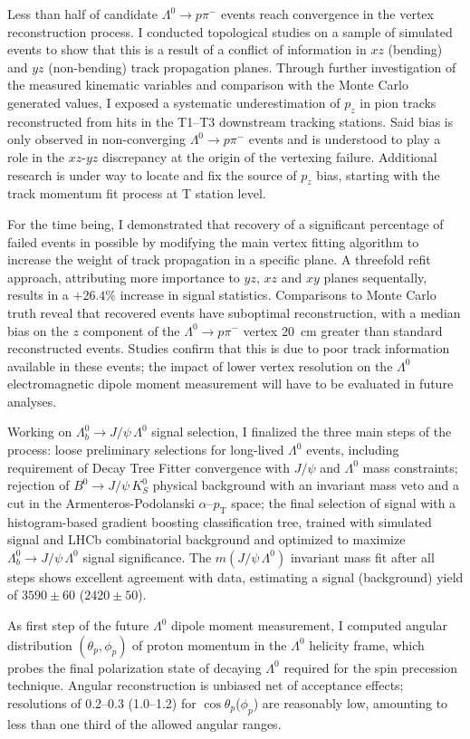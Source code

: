 \documentclass[12pt,a4paper]{book}
\newcommand{\demonstratorshort}{$\Lambda_b^0 \rightarrow J/\psi\,\Lambda^0$\xspace}
\newcommand{\physbkgshort}{$B^0 \rightarrow J/\psi\,K^0_S$\xspace}
\newcommand{\lz}{$\Lambda^0$\xspace}
\newcommand{\jpsi}{$J/\psi$\xspace}
\newcommand{\lambdadecay}{$\Lambda^0 \rightarrow p\pi^-$\xspace}
\newcommand{\pt}{$p_\text{T}$\xspace}
\newcommand{\cthetap}{$\cos\theta_p$\xspace}
\newcommand{\phip}{$\phi_p$\xspace}
\begin{document}
Less than half of candidate \lambdadecay events reach convergence in the vertex reconstruction process.
I conducted topological studies on a sample of simulated events to show that this is a result of a conflict of information in $xz$ (bending) and $yz$ (non-bending) track propagation planes.
Through further investigation of the measured kinematic variables and comparison with the Monte Carlo generated values, I exposed a systematic underestimation of $p_z$ in pion tracks reconstructed from hits in the T1--T3 downstream tracking stations.
Said bias is only observed in non-converging \lambdadecay events and is understood to play a role in the $xz$-$yz$ discrepancy at the origin of the vertexing failure.
Additional research is under way to locate and fix the source of $p_z$ bias, starting with the track momentum fit process at T station level.

For the time being, I demonstrated that recovery of a significant percentage of failed events in possible by modifying the main vertex fitting algorithm to increase the weight of track propagation in a specific plane.
A threefold refit approach, attributing more importance to $yz$, $xz$ and $xy$ planes sequentally, results in a $+26.4\%$ increase in signal statistics.
Comparisons to Monte Carlo truth reveal that recovered events have suboptimal reconstruction, with a median bias on the $z$ component of the \lambdadecay vertex \SI{20}{\centi\meter} greater than standard reconstructed events.
Studies confirm that this is due to poor track information available in these events;
the impact of lower vertex resolution on the \lz electromagnetic dipole moment measurement will have to be evaluated in future analyses.

Working on \demonstratorshort signal selection, I finalized the three main steps of the process:
loose preliminary selections for long-lived \lz events, including requirement of Decay Tree Fitter convergence with \jpsi and \lz mass constraints;
rejection of \physbkgshort physical background with an invariant mass veto and a cut in the Armenteros-Podolanski $\alpha$--\pt space;
the final selection of signal with a histogram-based gradient boosting classification tree, trained with simulated signal and LHCb combinatorial background and optimized to maximize \demonstratorshort signal significance.
The $m(J/\psi\,\Lambda^0)$ invariant mass fit after all steps shows excellent agreement with data, estimating a signal (background) yield of $3590 \pm 60$ ($2420 \pm 50$).

As first step of the future \lz dipole moment measurement, I computed angular distribution $(\theta_p, \phi_p)$ of proton momentum in the \lz helicity frame, which probes the final polarization state of decaying \lz required for the spin precession technique.
Angular reconstruction is unbiased net of acceptance effects;
resolutions of 0.2--0.3 (1.0--1.2) for \cthetap (\phip) are reasonably low, amounting to less than one third of the allowed angular ranges.
\end{document}
